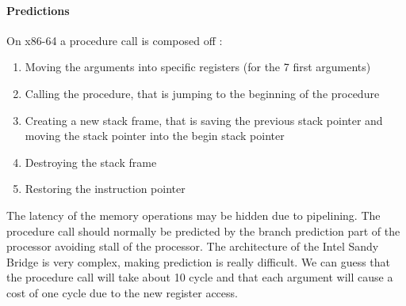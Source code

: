 \paragraph{Predictions}
On x86-64 a procedure call is composed off :
\begin{enumerate}
\item Moving the arguments into specific registers (for the 7 first arguments)
\item Calling the procedure, that is jumping to the beginning of the procedure
\item Creating a new stack frame, that is saving the previous stack pointer and
moving the stack pointer into the begin stack pointer
\item Destroying the stack frame
\item Restoring the instruction pointer
\end{enumerate}

The latency of the memory operations may be hidden due to pipelining.
The procedure call should normally be predicted by the branch prediction part of
the processor avoiding stall of the processor.
The architecture of the Intel Sandy Bridge is very complex, making prediction is
really difficult.
We can guess that the procedure call will take about 10 cycle and that each
argument will cause a cost of one cycle due to the new register access.

